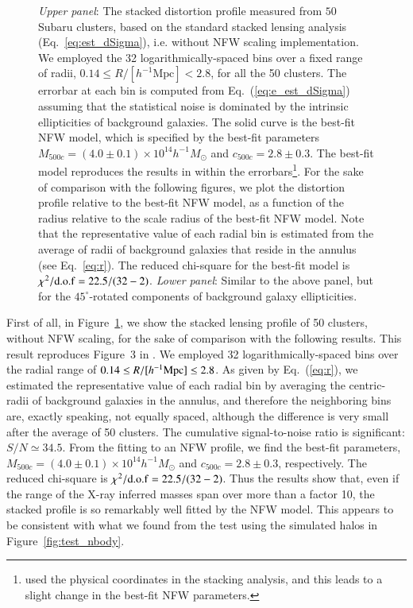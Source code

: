 \documentclass[iop, apj]{emulateapj}
\newcommand{\?}{\stackrel{?}{=}}
\begin{document}
\begin{figure}
%
%
 \caption{{\it Upper panel}: The stacked distortion profile measured
 from $50$ Subaru clusters, based on the standard stacked lensing
 analysis (Eq.~\ref{eq:est_dSigma}), i.e. without NFW scaling
 implementation. We employed the 32 logarithmically-spaced bins over a
 fixed range of radii, $0.14\le R/[h^{-1}\mbox{Mpc}]<2.8$, for all the
 50 clusters.
 The errorbar at each bin is computed from Eq.~(\ref{eq:e_est_dSigma})
 assuming that the statistical noise is dominated by the intrinsic
 ellipticities of background galaxies.  The solid curve is the best-fit
 NFW model, which is specified by the best-fit parameters
 $M_{500c}=(4.0\pm0.1)\times 10^{14}h^{-1}{M_\odot}$ and $c_{500c}= 2.8
 \pm 0.3$. The best-fit model reproduces the results in
 \citet{Okabeetal:13} within the errorbars\footnote{\citet{Okabeetal:13}
 used the physical coordinates in the stacking analysis, and this leads
 to a slight change in the best-fit NFW parameters.}. 
 For the sake of comparison with the following figures, we
 plot the distortion profile relative to the best-fit NFW model, as a
 function of the radius relative to the scale radius of the best-fit NFW
 model.  Note that the representative value of each radial bin is
 estimated from the average of radii of background galaxies that reside
 in the annulus (see Eq.~\ref{eq:r}). The reduced chi-square for the
 best-fit model is $\chi^2/{\rm d.o.f}=22.5/(32-2)$.  {\it Lower panel}:
 Similar to the above panel, but for the $45^{\circ}$-rotated components
 of background galaxy ellipticities.  } \label{fig:dSigma}
\end{figure}
%
First of all, in Figure~\ref{fig:dSigma}, we show the stacked lensing
profile of 50 clusters, without NFW scaling, for the sake of comparison
with the following results. This result reproduces Figure~3 in
\citet{Okabeetal:13}.  We employed 32 logarithmically-spaced bins over
the radial range of $0.14\le R/[h^{-1}{\rm Mpc}] \le 2.8$. As given by
Eq.~(\ref{eq:r}), we estimated the representative value of each radial
bin by averaging the centric-radii of background galaxies in the
annulus, and therefore the neighboring bins are, exactly speaking, not
equally spaced, although the difference is very small after the average
of 50 clusters.  The cumulative signal-to-noise ratio is significant:
$S/N\simeq 34.5$. From the fitting to an NFW profile, we find the
best-fit parameters, $M_{500c}=(4.0\pm0.1)\times 10^{14}h^{-1}{M_\odot}$
and $c_{500c}= 2.8 \pm 0.3$, respectively. The reduced chi-square is
$\chi^2/{\rm d.o.f}=22.5/(32-2)$.  Thus the results show that, even if
the range of the X-ray inferred masses span over more than a factor 10,
the stacked profile is so remarkably well fitted by the NFW model. This
appears to be consistent with what we found from the test using the
simulated halos in Figure~\ref{fig:test_nbody}.
\end{document}
